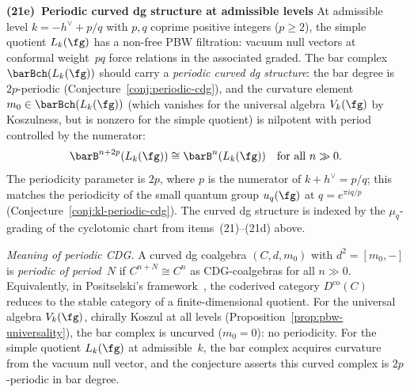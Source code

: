 \smallskip\noindent
\textbf{(21e)~Periodic curved dg structure at admissible levels}%
\label{item:concordance-periodic-cdg}%
%
%
%
\ClaimStatusConjectured{}
At admissible level $k = -h^\vee + p/q$ with $p, q$
coprime positive integers ($p \geq 2$), the simple
quotient $L_k(\fg)$
has a non-free PBW filtration: vacuum null vectors at
conformal weight~$pq$ force relations in the associated
graded. The bar complex $\barBch(L_k(\fg))$ should
carry a \emph{periodic curved dg structure}: the
bar degree is $2p$-periodic
(Conjecture~\ref{conj:periodic-cdg}), and the
curvature element $m_0 \in \barBch(L_k(\fg))$
(which vanishes for the universal algebra $V_k(\fg)$
by Koszulness, but is nonzero for the simple quotient)
is nilpotent with period controlled by the numerator:
\[
 \barB^{n+2p}(L_k(\fg)) \cong \barB^n(L_k(\fg))
 \quad\text{for all } n \gg 0.
\]
The periodicity parameter is $2p$, where $p$ is the
numerator of $k + h^\vee = p/q$; this matches the
periodicity of
the small quantum group $u_q(\fg)$ at
$q = e^{\pi i q/p}$
(Conjecture~\ref{conj:kl-periodic-cdg}).
The curved dg structure is indexed by the
$\mu_q$-grading of the cyclotomic chart from
items~\textup{(21)--(21d)} above.

\emph{Meaning of periodic CDG.}
A curved dg coalgebra $(C, d, m_0)$ with $d^2 = [m_0, -]$
is \emph{periodic of period~$N$} if $C^{n+N} \cong C^n$
as CDG-coalgebras for all $n \gg 0$.
Equivalently, in Positselski's framework~\cite{Positselski11},
the coderived category $D^{\mathrm{co}}(C)$ reduces to
the stable category of a finite-dimensional quotient.
For the universal algebra $V_k(\fg)$, chirally Koszul
at all levels (Proposition~\ref{prop:pbw-universality}),
the bar complex is uncurved ($m_0 = 0$): no periodicity.
For the simple quotient $L_k(\fg)$ at admissible~$k$,
the bar complex acquires curvature from the vacuum null
vector, and the conjecture asserts this curved complex
is $2p$-periodic in bar degree.

